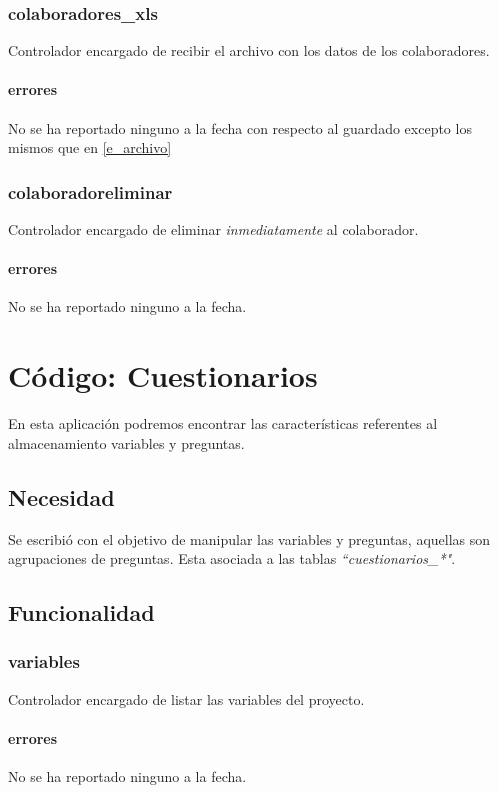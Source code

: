 \documentclass[10pt,a4paper]{book}
\begin{document}
	\subsection{colaboradores\_xls}
	Controlador encargado de recibir el archivo con los datos de los colaboradores.
	\subsubsection{errores}
	No se ha reportado ninguno a la fecha con respecto al guardado excepto los mismos que en \ref{e_archivo}

	\subsection{colaboradoreliminar}
	Controlador encargado de eliminar \textit{inmediatamente} al colaborador.
	\subsubsection{errores}
	No se ha reportado ninguno a la fecha.


	\chapter{Código: Cuestionarios}
	
	En esta aplicación podremos encontrar las características referentes al almacenamiento variables y preguntas.
	
	\section{Necesidad}
	
	Se escribió con el objetivo de manipular las variables y preguntas, aquellas son agrupaciones de preguntas. Esta asociada a las tablas  \textit{``cuestionarios\_*"}. 
	
	\section{Funcionalidad}

	\subsection{variables}
	Controlador encargado de listar las variables del proyecto.
	\subsubsection{errores}
	No se ha reportado ninguno a la fecha.
	
\end{document}
